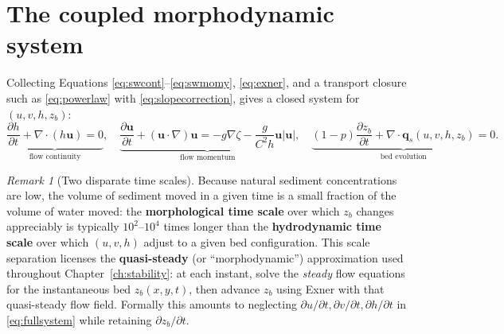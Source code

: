 \documentclass[11pt,a4paper]{report}
\theoremstyle{definition}
\theoremstyle{plain}
\theoremstyle{remark}
\newtheorem{remark}{Remark}[chapter]
\newcommand{\pdv}[2]{\dfrac{\partial #1}{\partial #2}}
\newcommand{\vect}[1]{\boldsymbol{#1}}
\begin{document}
\section{The coupled morphodynamic system}

Collecting Equations \eqref{eq:swcont}--\eqref{eq:swmomy}, \eqref{eq:exner}, and a transport closure such as \eqref{eq:powerlaw} with \eqref{eq:slopecorrection}, gives a closed system for $(u,v,h,z_b)$:
\begin{equation}
\underbrace{\pdv{h}{t}+\nabla\cdot(h\vect u)=0}_{\text{flow continuity}}, \quad
\underbrace{\pdv{\vect u}{t}+(\vect u\cdot\nabla)\vect u = -g\nabla\zeta - \dfrac{g}{C^2 h}\vect u|\vect u|}_{\text{flow momentum}}, \quad
\underbrace{(1-p)\pdv{z_b}{t}+\nabla\cdot\vect q_s(u,v,h,z_b)=0}_{\text{bed evolution}}.
\label{eq:fullsystem}
\end{equation}

\begin{remark}[Two disparate time scales]
Because natural sediment concentrations are low, the volume of sediment moved in a given time is a small fraction of the volume of water moved: the \textbf{morphological time scale} over which $z_b$ changes appreciably is typically $10^2$--$10^4$ times longer than the \textbf{hydrodynamic time scale} over which $(u,v,h)$ adjust to a given bed configuration. This scale separation licenses the \textbf{quasi-steady} (or ``morphodynamic'') approximation used throughout Chapter~\ref{ch:stability}: at each instant, solve the \emph{steady} flow equations for the instantaneous bed $z_b(x,y,t)$, then advance $z_b$ using Exner with that quasi-steady flow field. Formally this amounts to neglecting $\partial u/\partial t,\partial v/\partial t,\partial h/\partial t$ in \eqref{eq:fullsystem} while retaining $\partial z_b/\partial t$.
\end{remark}
\end{document}
